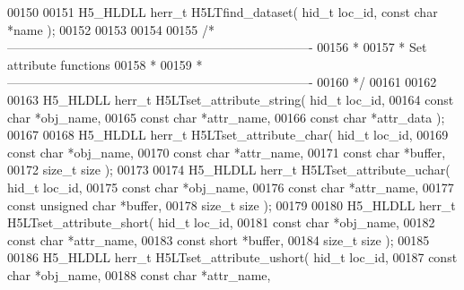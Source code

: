 \begin{DoxyCode}
00150 
00151 H5\_HLDLL herr\_t  H5LTfind\_dataset( hid\_t loc\_id, \textcolor{keyword}{const} \textcolor{keywordtype}{char} *name );
00152 
00153 
00154 
00155 \textcolor{comment}{/*-------------------------------------------------------------------------}
00156 \textcolor{comment}{ *}
00157 \textcolor{comment}{ * Set attribute functions}
00158 \textcolor{comment}{ *}
00159 \textcolor{comment}{ *-------------------------------------------------------------------------}
00160 \textcolor{comment}{ */}
00161 
00162 
00163 H5\_HLDLL herr\_t  H5LTset\_attribute\_string( hid\_t loc\_id,
00164                                  \textcolor{keyword}{const} \textcolor{keywordtype}{char} *obj\_name,
00165                                  \textcolor{keyword}{const} \textcolor{keywordtype}{char} *attr\_name,
00166                                  \textcolor{keyword}{const} \textcolor{keywordtype}{char} *attr\_data );
00167 
00168 H5\_HLDLL herr\_t  H5LTset\_attribute\_char( hid\_t loc\_id,
00169                                \textcolor{keyword}{const} \textcolor{keywordtype}{char} *obj\_name,
00170                                \textcolor{keyword}{const} \textcolor{keywordtype}{char} *attr\_name,
00171                                \textcolor{keyword}{const} \textcolor{keywordtype}{char} *buffer,
00172                                \textcolor{keywordtype}{size\_t} size );
00173 
00174 H5\_HLDLL herr\_t  H5LTset\_attribute\_uchar( hid\_t loc\_id,
00175                                \textcolor{keyword}{const} \textcolor{keywordtype}{char} *obj\_name,
00176                                \textcolor{keyword}{const} \textcolor{keywordtype}{char} *attr\_name,
00177                                \textcolor{keyword}{const} \textcolor{keywordtype}{unsigned} \textcolor{keywordtype}{char} *buffer,
00178                                \textcolor{keywordtype}{size\_t} size );
00179 
00180 H5\_HLDLL herr\_t  H5LTset\_attribute\_short( hid\_t loc\_id,
00181                               \textcolor{keyword}{const} \textcolor{keywordtype}{char} *obj\_name,
00182                               \textcolor{keyword}{const} \textcolor{keywordtype}{char} *attr\_name,
00183                               \textcolor{keyword}{const} \textcolor{keywordtype}{short} *buffer,
00184                               \textcolor{keywordtype}{size\_t} size );
00185 
00186 H5\_HLDLL herr\_t  H5LTset\_attribute\_ushort( hid\_t loc\_id,
00187                               \textcolor{keyword}{const} \textcolor{keywordtype}{char} *obj\_name,
00188                               \textcolor{keyword}{const} \textcolor{keywordtype}{char} *attr\_name,

\end{DoxyCode}
